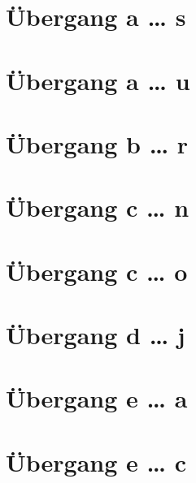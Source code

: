 \documentclass[a4paper,landscape]{article}
\begin{document}
\hspace*{-1ex}
\newpage

\section{Übergang a … s }

\hspace*{-1ex}
\newpage

\section{Übergang a … u }

\hspace*{-1ex}
\newpage

\section{Übergang b … r }

\hspace*{-1ex}
\newpage

\section{Übergang c … n }

\hspace*{-1ex}
\newpage

\section{Übergang c … o }

\hspace*{-1ex}
\newpage

\section{Übergang d … j }

\hspace*{-1ex}
\newpage

\section{Übergang e … a }

\hspace*{-1ex}
\newpage

\section{Übergang e … c }
\end{document}
